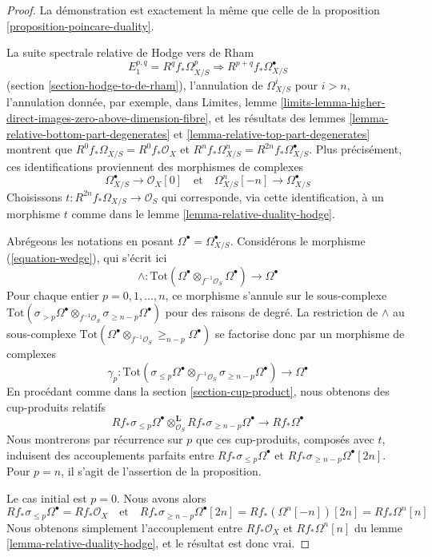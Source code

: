 \begin{proof}
La démonstration est exactement la même que celle de la
proposition \ref{proposition-poincare-duality}.

\medskip\noindent
La suite spectrale relative de Hodge vers de Rham
$$
E_1^{p, q} = R^qf_*\Omega^p_{X/S} \Rightarrow R^{p + q}f_*\Omega^\bullet_{X/S}
$$
(section \ref{section-hodge-to-de-rham}), l'annulation
de $\Omega^i_{X/S}$ pour $i > n$, l'annulation donnée, par exemple, dans Limites, lemme
\ref{limits-lemma-higher-direct-images-zero-above-dimension-fibre},
et les résultats des lemmes \ref{lemma-relative-bottom-part-degenerates} et
\ref{lemma-relative-top-part-degenerates}
montrent que $R^0f_*\Omega_{X/S} = R^0f_*\mathcal{O}_X$
et $R^nf_*\Omega^n_{X/S} = R^{2n}f_*\Omega^\bullet_{X/S}$.
Plus précisément, ces identifications proviennent des morphismes
de complexes
$$
\Omega^\bullet_{X/S} \to \mathcal{O}_X[0]
\quad\text{et}\quad
\Omega^n_{X/S}[-n] \to \Omega^\bullet_{X/S}
$$
Choisissons $t : R^{2n}f_*\Omega_{X/S} \to \mathcal{O}_S$
qui corresponde, via cette identification, à un morphisme $t$ comme dans le
lemme \ref{lemma-relative-duality-hodge}.

\medskip\noindent
Abrégeons les notations en posant $\Omega^\bullet = \Omega^\bullet_{X/S}$.
Considérons le morphisme (\ref{equation-wedge}), qui s'écrit ici
$$
\wedge :
\text{Tot}(\Omega^\bullet \otimes_{f^{-1}\mathcal{O}_S} \Omega^\bullet)
\longrightarrow
\Omega^\bullet
$$
Pour chaque entier $p = 0, 1, \ldots, n$, ce morphisme s'annule sur le sous-complexe
$\text{Tot}(\sigma_{> p} \Omega^\bullet \otimes_{f^{-1}\mathcal{O}_S}
\sigma_{\geq n - p} \Omega^\bullet)$ pour des raisons de degré.
La restriction de $\wedge$ au sous-complexe
$\text{Tot}(\Omega^\bullet \otimes_{f^{-1}\mathcal{O}_S}
\geq_{n - p}\Omega^\bullet)$ se factorise donc par un morphisme de complexes
$$
\gamma_p :
\text{Tot}(\sigma_{\leq p} \Omega^\bullet \otimes_{f^{-1}\mathcal{O}_S}
\sigma_{\geq n - p} \Omega^\bullet)
\longrightarrow
\Omega^\bullet
$$
En procédant comme dans la section \ref{section-cup-product}, nous obtenons
des cup-produits relatifs
$$
Rf_*\sigma_{\leq p} \Omega^\bullet
\otimes_{\mathcal{O}_S}^\mathbf{L}
Rf_*\sigma_{\geq n - p}\Omega^\bullet
\longrightarrow
Rf_*\Omega^\bullet
$$
Nous montrerons par récurrence sur $p$ que ces cup-produits, composés avec $t$,
induisent des accouplements parfaits entre $Rf_*\sigma_{\leq p} \Omega^\bullet$
et $Rf_*\sigma_{\geq n - p}\Omega^\bullet[2n]$. Pour $p = n$,
il s'agit de l'assertion de la proposition.

\medskip\noindent
Le cas initial est $p = 0$. Nous avons alors
$$
Rf_*\sigma_{\leq p}\Omega^\bullet = Rf_*\mathcal{O}_X
\quad\text{et}\quad
Rf_*\sigma_{\geq n - p}\Omega^\bullet[2n] = Rf_*(\Omega^n[-n])[2n] =
Rf_*\Omega^n[n]
$$
Nous obtenons simplement l'accouplement
entre $Rf_*\mathcal{O}_X$ et $Rf_*\Omega^n[n]$ du
lemme \ref{lemma-relative-duality-hodge}, et le résultat est donc vrai.


\end{proof}
